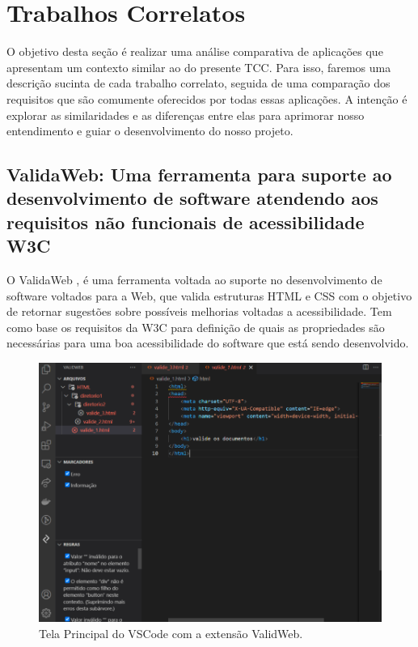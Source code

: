 \chapter{Trabalhos Correlatos}

O objetivo desta seção é realizar uma análise comparativa de aplicações que apresentam um contexto similar ao do presente TCC. Para isso, faremos uma descrição sucinta de cada trabalho correlato, seguida de uma comparação dos requisitos que são comumente oferecidos por todas essas aplicações. A intenção é explorar as similaridades e as diferenças entre elas para aprimorar nosso entendimento e guiar o desenvolvimento do nosso projeto.

\section{ValidaWeb: Uma ferramenta para suporte ao desenvolvimento de software atendendo aos requisitos não funcionais de acessibilidade W3C}

O ValidaWeb \cite{validaweb}, é uma ferramenta voltada ao suporte no desenvolvimento de software voltados para a Web, que valida estruturas HTML e CSS com o objetivo de retornar sugestões sobre possíveis melhorias voltadas a acessibilidade. Tem como base os requisitos da W3C para definição de quais as propriedades são necessárias para uma boa acessibilidade do software que está sendo desenvolvido.

\begin{figure}[!h]
	\centering
	\caption{Tela Principal do VSCode com a extensão ValidWeb.}
	\includegraphics[width=432pt]{Assets/ValidaWeb.png}
\end{figure}

